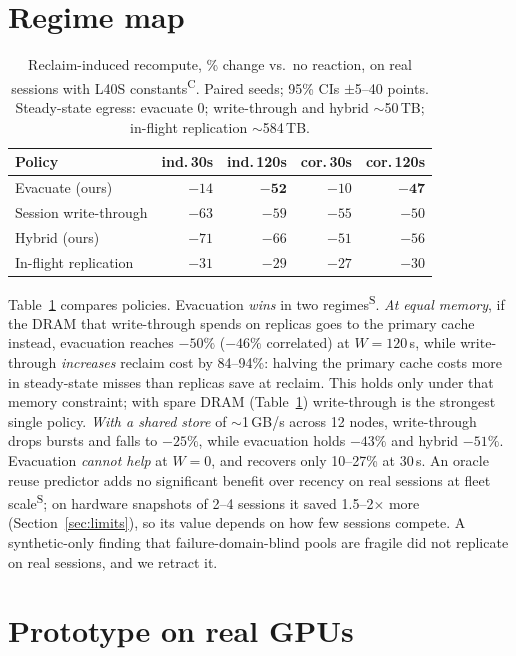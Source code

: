 \documentclass[10pt,twocolumn]{article}
\newcommand{\Sim}{\textsuperscript{S}}
\newcommand{\Cal}{\textsuperscript{C}}
\begin{document}
\section{Regime map}\label{sec:regime}
\begin{table}[t]
\centering\footnotesize\setlength{\tabcolsep}{3.5pt}
\begin{tabular}{@{}lrrrr@{}}
\toprule
Policy & ind.\,30s & ind.\,120s & cor.\,30s & cor.\,120s \\
\midrule
Evacuate (ours) & $-14$ & $\mathbf{-52}$ & $-10$ & $\mathbf{-47}$ \\
Session write-through & $-63$ & $-59$ & $-55$ & $-50$ \\
Hybrid (ours) & $-71$ & $-66$ & $-51$ & $-56$ \\
In-flight replication & $-31$ & $-29$ & $-27$ & $-30$ \\
\bottomrule
\end{tabular}
\caption{Reclaim-induced recompute, \% change vs.\ no reaction, on real sessions with
L40S constants\Cal. Paired seeds; 95\% CIs $\pm$5--40 points. Steady-state egress:
evacuate 0; write-through and hybrid $\sim$50\,TB; in-flight replication
$\sim$584\,TB.}
\label{tab:regime}
\end{table}
Table~\ref{tab:regime} compares policies. Evacuation \emph{wins} in two regimes\Sim.
\emph{At equal memory}, if the DRAM that write-through spends on replicas goes to the
primary cache instead, evacuation reaches $-50\%$ ($-46\%$ correlated) at
$W{=}120$\,s, while write-through \emph{increases} reclaim cost by 84--94\%:
halving the primary cache costs more in steady-state misses than replicas save at
reclaim. This holds only under that memory constraint; with spare DRAM
(Table~\ref{tab:regime}) write-through is the strongest single policy.
\emph{With a shared store} of $\sim$1\,GB/s across 12 nodes, write-through drops
bursts and falls to $-25\%$, while evacuation holds $-43\%$ and hybrid $-51\%$.
Evacuation \emph{cannot help} at $W{=}0$, and recovers only 10--27\% at 30\,s. An
oracle reuse predictor adds no significant benefit over recency on real
sessions at fleet scale\Sim; on hardware snapshots of 2--4 sessions it saved 1.5--2$\times$
more (Section~\ref{sec:limits}), so its value depends on how few sessions compete. A synthetic-only finding that failure-domain-blind pools are fragile
did not replicate on real sessions, and we retract it.

\section{Prototype on real GPUs}\label{sec:proto}
\end{document}
